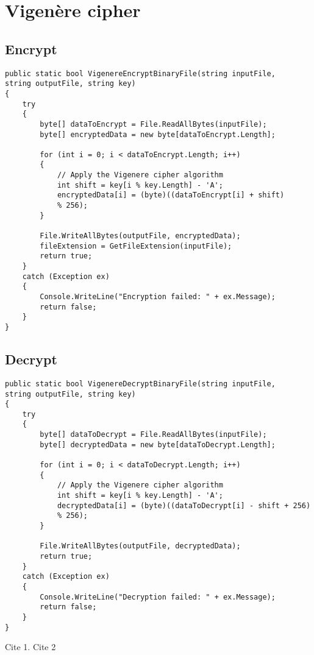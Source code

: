 \documentclass[a4paper,oneside,11pt]{book}
\begin{document}
\MakeTitle 
{} 
\tableofcontents
\cleardoublepage 
{} 

\chapter[Vigenère cipher]{Vigenère cipher}
\section{Encrypt}
\begin{lstlisting}[language=Csh, caption={Endpoint to delete FITS file}]
public static bool VigenereEncryptBinaryFile(string inputFile, 
string outputFile, string key)
{
    try
    {
        byte[] dataToEncrypt = File.ReadAllBytes(inputFile);
        byte[] encryptedData = new byte[dataToEncrypt.Length];

        for (int i = 0; i < dataToEncrypt.Length; i++)
        {
            // Apply the Vigenere cipher algorithm
            int shift = key[i % key.Length] - 'A'; 
            encryptedData[i] = (byte)((dataToEncrypt[i] + shift) 
            % 256);
        }

        File.WriteAllBytes(outputFile, encryptedData);
        fileExtension = GetFileExtension(inputFile);
        return true;
    }
    catch (Exception ex)
    {
        Console.WriteLine("Encryption failed: " + ex.Message);
        return false;
    }
}
\end{lstlisting}
\section{Decrypt}
\pagestyle{plain}
\begin{lstlisting}[language=Csh, caption={Endpoint to delete FITS file}]
public static bool VigenereDecryptBinaryFile(string inputFile, 
string outputFile, string key)
{
    try
    {
        byte[] dataToDecrypt = File.ReadAllBytes(inputFile);
        byte[] decryptedData = new byte[dataToDecrypt.Length];

        for (int i = 0; i < dataToDecrypt.Length; i++)
        {
            // Apply the Vigenere cipher algorithm
            int shift = key[i % key.Length] - 'A';
            decryptedData[i] = (byte)((dataToDecrypt[i] - shift + 256)
            % 256);
        }

        File.WriteAllBytes(outputFile, decryptedData);
        return true;
    }
    catch (Exception ex)
    {
        Console.WriteLine("Decryption failed: " + ex.Message);
        return false;
    }
}
\end{lstlisting}
Cite 1\citep{AUT2018}.\vspace{0.25cm}
\noindent Cite 2 \citep{AUT1999}
\end{document}
